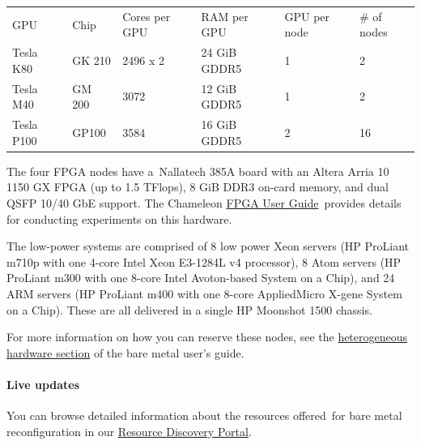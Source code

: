 \begin{longtable}[]{@{}llllll@{}}
\toprule
GPU & Chip & Cores per GPU & RAM per GPU & GPU per node & \# of
nodes\tabularnewline
Tesla K80 & GK 210 & 2496 x 2 & 24 GiB GDDR5 & 1 & 2\tabularnewline
Tesla M40 & GM 200 & 3072 & 12 GiB GDDR5 & 1 & 2\tabularnewline
Tesla P100 & GP100 & 3584 & 16 GiB GDDR5 & 2 & 16\tabularnewline
\bottomrule
\end{longtable}

The four FPGA nodes have a~Nallatech 385A board with an Altera Arria 10
1150 GX FPGA (up to 1.5 TFlops), 8 GiB DDR3 on-card memory, and dual
QSFP 10/40 GbE support. The Chameleon
\href{https://www.chameleoncloud.org/docs/bare-metal-user-guide/fpga/}{FPGA
User Guide}~provides details for conducting experiments on this
hardware.

The low-power systems are comprised of 8 low power Xeon servers (HP
ProLiant m710p with one 4-core Intel Xeon E3-1284L v4 processor), 8 Atom
servers (HP ProLiant m300 with one 8-core Intel Avoton-based System on a
Chip), and 24 ARM servers (HP ProLiant m400 with one 8-core AppliedMicro
X-gene System on a Chip). These are all delivered in a single HP
Moonshot 1500 chassis.

For more information on how you can reserve these nodes, see the
\href{https://www.chameleoncloud.org/docs/bare-metal-user-guide/\#heterogeneous_hardware}{heterogeneous
hardware section} of the bare metal user's guide.


\paragraph{Live updates}
You can browse detailed information about the resources
offered~for bare metal reconfiguration in our
\href{https://www.chameleoncloud.org/user/discovery/}{Resource Discovery
Portal}.
